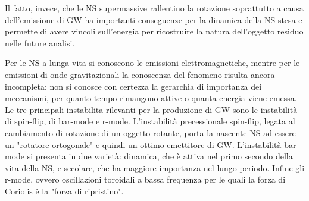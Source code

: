 Il fatto, invece, che le NS supermassive rallentino la rotazione soprattutto a causa dell'emissione di GW ha importanti conseguenze per la dinamica della NS stesa e permette di avere vincoli sull'energia per ricostruire la natura dell'oggetto residuo nelle future analisi.

Per le NS a lunga vita si conoscono le emissioni elettromagnetiche, mentre per le emissioni di onde gravitazionali la conoscenza del fenomeno risulta ancora incompleta: non si conosce con certezza la gerarchia di importanza dei meccanismi, per quanto tempo rimangono attive o quanta energia viene emessa. Le tre principali instabilita rilevanti per la produzione di GW sono le instabilità di spin-flip, di bar-mode e r-mode.
L'instabilità precessionale spin-flip, legata al cambiamento di rotazione di un oggetto rotante, porta la nascente NS ad essere un "rotatore ortogonale" e quindi un ottimo emettitore di GW.
L'instabilità bar-mode si presenta in due varietà: dinamica, che è attiva nel primo secondo della vita della NS, e secolare, che ha maggiore importanza nel lungo periodo. 
Infine gli r-mode, ovvero oscillazioni toroidali a bassa frequenza per le quali la forza di Coriolis è la "forza di ripristino"\cite{sarin2020evolution}.